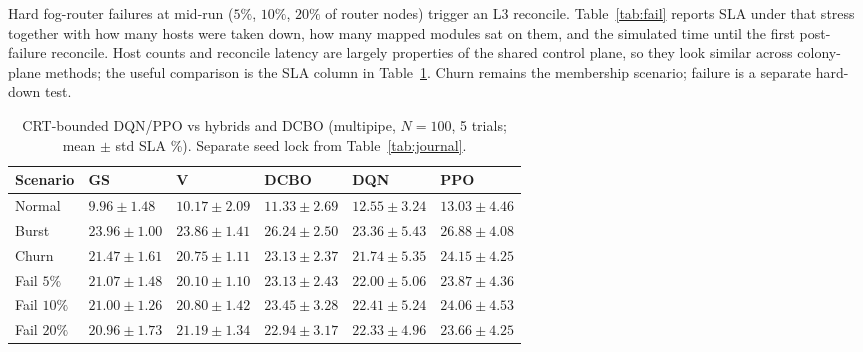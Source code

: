 \documentclass[11pt,a4paper]{article}
\begin{document}
Hard fog-router failures at mid-run ($5\%$, $10\%$, $20\%$ of router nodes)
trigger an L3 reconcile. Table~\ref{tab:fail} reports SLA under that stress
together with how many hosts were taken down, how many mapped modules sat on
them, and the simulated time until the first post-failure reconcile. Host counts
and reconcile latency are largely properties of the shared control plane, so
they look similar across colony-plane methods; the useful comparison is the SLA
column in Table~\ref{tab:dqnppo}. Churn remains the membership scenario; failure
is a separate hard-down test.

\begin{table}[htbp]
\centering
\caption{CRT-bounded DQN/PPO vs hybrids and DCBO (multipipe, $N{=}100$,
5 trials; mean $\pm$ std SLA \%). Separate seed lock from Table~\ref{tab:journal}.}
\label{tab:dqnppo}
\small
\begin{tabular}{@{}llllll@{}}
\toprule
Scenario & GS & V & DCBO & DQN & PPO \\
\midrule
Normal & $9.96{\pm}1.48$ & $10.17{\pm}2.09$ & $11.33{\pm}2.69$ & $12.55{\pm}3.24$ & $13.03{\pm}4.46$ \\
Burst & $23.96{\pm}1.00$ & $23.86{\pm}1.41$ & $26.24{\pm}2.50$ & $23.36{\pm}5.43$ & $26.88{\pm}4.08$ \\
Churn & $21.47{\pm}1.61$ & $20.75{\pm}1.11$ & $23.13{\pm}2.37$ & $21.74{\pm}5.35$ & $24.15{\pm}4.25$ \\
Fail $5\%$ & $21.07{\pm}1.48$ & $20.10{\pm}1.10$ & $23.13{\pm}2.43$ & $22.00{\pm}5.06$ & $23.87{\pm}4.36$ \\
Fail $10\%$ & $21.00{\pm}1.26$ & $20.80{\pm}1.42$ & $23.45{\pm}3.28$ & $22.41{\pm}5.24$ & $24.06{\pm}4.53$ \\
Fail $20\%$ & $20.96{\pm}1.73$ & $21.19{\pm}1.34$ & $22.94{\pm}3.17$ & $22.33{\pm}4.96$ & $23.66{\pm}4.25$ \\
\bottomrule
\end{tabular}
\end{table}
\end{document}
